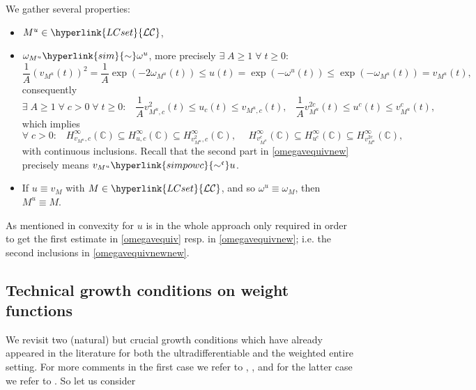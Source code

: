 \documentclass[10pt]{amsart}%
\numberwithin{equation}{section}
\theoremstyle{plain}
\newcommand{\CC}{\mathbb{C}}
\begin{document}
We gather several properties:

\begin{itemize}
\item[$(i)$] $M^u\in\hyperlink{LCset}{\mathcal{LC}}$,

\item[$(ii)$] $\omega_{M^u}\hyperlink{sim}{\sim}\omega^u$, more precisely $\exists\;A\ge 1\;\forall\;t\ge 0:$
\begin{equation}\label{omegavequiv}
\frac{1}{A}(v_{M^{u}}(t))^{2}=\frac{1}{A}\exp(-2\omega_{M^u}(t))\le u(t)=\exp(-\omega^u(t))\le\exp(-\omega_{M^u}(t))=v_{M^u}(t),
\end{equation}
consequently
\begin{equation}\label{omegavequivnew}
\exists\;A\ge 1\;\forall\;c>0\;\forall\;t\ge 0:\;\;\;\frac{1}{A}v^2_{M^u,c}(t)\le u_c(t)\le v_{M^u,c}(t),\;\;\;\frac{1}{A}v^{2c}_{M^u}(t)\le u^c(t)\le v^c_{M^u}(t),
\end{equation}
which implies
\begin{equation}\label{omegavequivnewnew}
\forall\;c>0:\;\;\;H^{\infty}_{v_{M^u},c}(\CC)\subseteq H^{\infty}_{u,c}(\CC)\subseteq H^{\infty}_{v^2_{M^u},c}(\CC),\hspace{15pt}H^{\infty}_{v^c_{M^u}}(\CC)\subseteq H^{\infty}_{u^c}(\CC)\subseteq H^{\infty}_{v^{2c}_{M^u}}(\CC),
\end{equation}
with continuous inclusions. Recall that the second part in \eqref{omegavequivnew} precisely means $v_{M^u}\hyperlink{simpowc}{\sim^{\mathfrak{c}}}u$.

\item[$(iii)$] If $u\equiv v_M$ with $M\in\hyperlink{LCset}{\mathcal{LC}}$, and so $\omega^u\equiv\omega_M$, then $M^u\equiv M$.
\end{itemize}

As mentioned in \cite[Rem. 2.13]{weightedentirecharacterization} convexity for $u$ is in the whole approach only required in order to get the first estimate in \eqref{omegavequiv} resp. in \eqref{omegavequivnew}; i.e. the second inclusions in \eqref{omegavequivnewnew}.

\subsection{Technical growth conditions on weight functions}\label{modweightsection}
We revisit two (natural) but crucial growth conditions which have already appeared in the literature for both the ultradifferentiable and the weighted entire setting. For more comments in the first case we refer to \cite{BonetMeiseMelikhov07}, \cite{compositionpaper}, \cite{dissertation} and for the latter case we refer to \cite[Sect. 2.8 \& 2.9]{weightedentirecharacterization}. So let us consider
\end{document}
